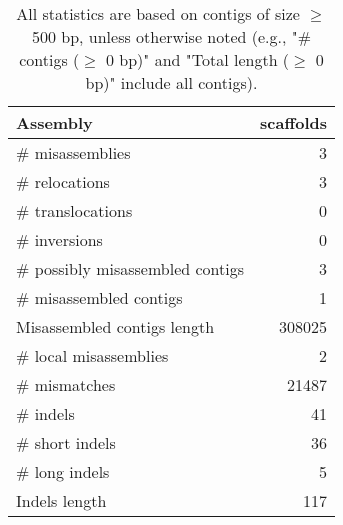 \documentclass[12pt,a4paper]{article}
\begin{document}
\begin{table}[ht]
\begin{center}
\caption{All statistics are based on contigs of size $\geq$ 500 bp, unless otherwise noted (e.g., "\# contigs ($\geq$ 0 bp)" and "Total length ($\geq$ 0 bp)" include all contigs).}
\begin{tabular}{|l*{1}{|r}|}
\hline
Assembly & scaffolds \\ \hline
\# misassemblies & 3 \\ \hline
\hspace{5mm}\# relocations & 3 \\ \hline
\hspace{5mm}\# translocations & 0 \\ \hline
\hspace{5mm}\# inversions & 0 \\ \hline
\# possibly misassembled contigs & 3 \\ \hline
\# misassembled contigs & 1 \\ \hline
Misassembled contigs length & 308025 \\ \hline
\# local misassemblies & 2 \\ \hline
\# mismatches & 21487 \\ \hline
\# indels & 41 \\ \hline
\hspace{5mm}\# short indels & 36 \\ \hline
\hspace{5mm}\# long indels & 5 \\ \hline
Indels length & 117 \\ \hline
\end{tabular}
\end{center}
\end{table}
\end{document}
